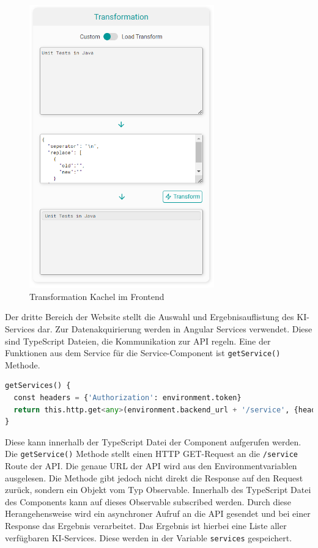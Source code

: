 \begin{figure}[H]
  \centering
    \includegraphics[width = 8cm]{bilder/websiteTransformation}
    \caption{Transformation Kachel im Frontend}
\end{figure}

Der dritte Bereich der Website stellt die Auswahl und Ergebnisauflistung des KI-Services dar. Zur Datenakquirierung werden in Angular Services verwendet. Diese sind TypeScript Dateien, die Kommunikation zur API regeln. Eine der Funktionen aus dem Service für die Service-Component ist \texttt{getService()} Methode. 

\begin{lstlisting}[language=Python]
getServices() {
  const headers = {'Authorization': environment.token}
  return this.http.get<any>(environment.backend_url + '/service', {headers})
}
\end{lstlisting}

Diese kann innerhalb der TypeScript Datei der Component aufgerufen werden. Die \texttt{getService()} Methode stellt einen HTTP GET-Request an die \texttt{/service} Route der API. Die genaue URL der API wird aus den Environmentvariablen ausgelesen. Die Methode gibt jedoch nicht direkt die Response auf den Request zurück, sondern ein Objekt vom Typ Observable. Innerhalb des TypeScript Datei des Components kann auf dieses Observable subscribed werden. Durch diese Herangehensweise wird ein asynchroner Aufruf an die API gesendet und bei einer Response das Ergebnis verarbeitet. Das Ergebnis ist hierbei eine Liste aller verfügbaren KI-Services. Diese werden in der Variable \texttt{services} gespeichert.


